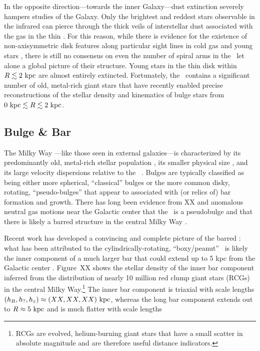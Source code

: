 In the opposite direction---towards the inner Galaxy---dust extinction severely hampers studies of the Galaxy. Only the brightest and reddest stars observable in the infrared can pierce through the thick veils of interstellar dust associated with the gas in the thin \mwdisk. For this reason, while there is evidence for the existence of non-axisymmetric disk features along particular sight lines in cold gas \citep{todo} and young stars \citep[cepheids;][]{todo}, there is still no consensus on even the number of spiral arms in the \mwdisk\ let alone a global picture of their structure. Young stars in the thin disk within $R \lesssim 2~\mathrm{kpc}$ are almost entirely extincted. Fortunately, the \mwbulge\ contains a significant number of old, metal-rich giant stars that have recently enabled precise reconstructions of the stellar density and kinematics of bulge stars from $0~\mathrm{kpc} \lesssim R \lesssim 2~\mathrm{kpc}$.

\subsection{Bulge \& Bar}

The Milky Way \mwbulge---like those seen in external galaxies---is characterized by its predominantly old, metal-rich stellar population \citep[ages of XX, typical Fe/H;][]{todo}, its smaller physical size \citep[$R \lesssim 1$--$2~\kpc$;][]{todo}, and its large velocity dispersions relative to the \mwdisk\ \citep[$\sigma_v \sim 100~\kms$;][]{todo}. Bulges are typically classified as being either more spherical, ``classical'' bulges or the more common disky, rotating, ``pseudo-bulges'' that appear to associated with (or relics of) bar formation and growth. There has long been evidence from XX and anomalous neutral gas motions near the Galactic center that the \mwbulge\ is a pseudobulge \citep{blitz91, weiland94, binney97} and that there is likely a barred structure in the central Milky Way \citep{binney91}. 

Recent work has developed a convincing and complete picture of the barred \mwbulge: what has been attributed to the cylindrically-rotating, ``boxy/peanut'' \mwbulge\ is likely the inner component of a much larger bar that could extend up to 5 kpc from the Galactic center \citep{wegg13, todo}. Figure~XX shows the stellar density of the inner bar component inferred from the distribution of nearly 10 million red clump giant stars (RCGs) in the central Milky Way.\footnote{RCGs are evolved, helium-burning giant stars that have a small scatter in absolute magnitude and are therefore useful distance indicators.} The inner bar component is triaxial with scale lengths $(h_R, h_?, h_z) \approx (XX,XX,XX)~\mathrm{kpc}$, whereas the long bar component extends out to $R\approx 5~\mathrm{kpc}$ and is much flatter with scale lengths

